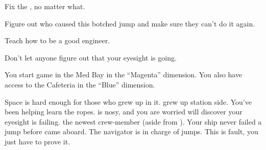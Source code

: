 \documentclass[char]{TMFHope}
\begin{document}
\begin{itemz}[Goals]
	\item Fix the \pNew{}, no matter what.
	\item Figure out who caused this botched jump and make sure they can't do it again.
	\item Teach \cBoy{} how to be a good engineer.
	\item Don't let anyone figure out that your eyesight is going.
\end{itemz}

\begin{itemz}[Notes]
	\item You start game in the Med Bay in the ``Magenta'' dimension. You also have access to the Cafeteria in the ``Blue'' dimension.
\end{itemz}

\begin{contacts}
	\contact{\cBoy{}} Space is hard enough for those who grew up in it. \cBoy{} grew up station side. You've been helping \cBoy{\them} learn the ropes.
	\contact{\cWeap{}} \cWeap{} is nosy, and you are worried \cWeap{\they} will discover your eyesight is failing.
	\contact{\cNav{}} \cNav{\They} \Nav{\are} the newest crew-member (aside from \cBoy{}). Your ship never failed a jump before \cNav{\they} came aboard. The navigator is in charge of jumps. This is \cNav{\their} fault, you just have to prove it.
\end{contacts}
\end{document}
